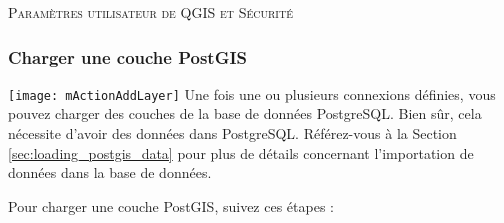 \begin{Astuce}\caption{\textsc{Paramètres utilisateur de QGIS et Sécurité}}
\end{Astuce}

\subsubsection{Charger une couche PostGIS}

\texttt{[image: mActionAddLayer]} Une fois une ou plusieurs connexions définies, vous pouvez charger des couches de la base de données PostgreSQL. Bien sûr, cela nécessite d'avoir des données dans PostgreSQL. Référez-vous à la Section \ref{sec:loading_postgis_data} pour plus de détails concernant l'importation de données dans la base de données.

Pour charger une couche PostGIS, suivez ces étapes :

